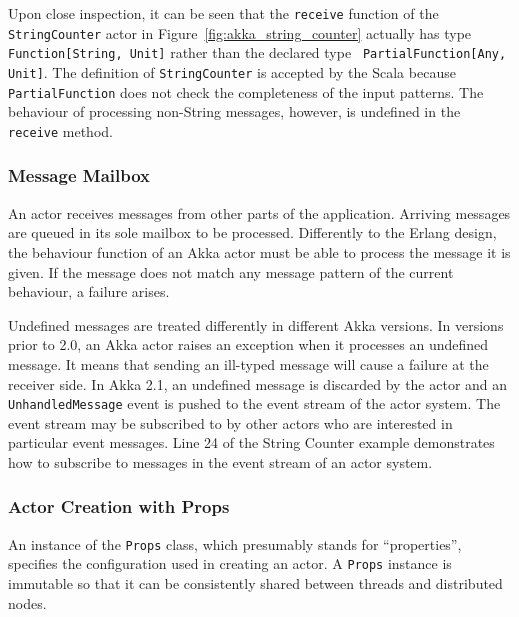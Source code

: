 Upon close inspection, it can be seen that the {\tt receive} function of the 
{\tt StringCounter} actor in Figure~\ref{fig:akka_string_counter} actually 
has type {\tt Function[String, Unit]} rather than the declared type {\tt 
PartialFunction[Any, Unit]}.  The definition  of {\tt StringCounter} is 
accepted by the Scala because {\tt PartialFunction} does not check the 
completeness of the input patterns.  The behaviour of processing non-String 
messages, however, is undefined in the {\tt receive} method.

\subsubsection{Message Mailbox}
\label{message mailbox}

An actor receives messages from other parts of the application.  Arriving 
messages are queued in its sole mailbox to be processed.  Differently to the 
Erlang design, the behaviour function of 
an Akka actor must be able to process the message it is given.  If the message 
does not match any message pattern of the current behaviour, a failure arises.

Undefined messages are treated differently in different Akka versions.  In
versions prior to 2.0, an Akka actor raises an exception when it processes an 
undefined message. It means that sending an ill-typed message will cause a 
failure at the receiver side.  In Akka 2.1, an undefined message is discarded 
by the actor and an {\tt UnhandledMessage} event is pushed to the event stream 
of the actor system. The event stream may be subscribed to by other actors who 
are interested in particular event messages.  Line 24 of the String Counter
example demonstrates how to subscribe to messages in the event stream
of an actor system.




\begin{comment}
In Akka 2.2, the {\tt 
Stash} trait can be used to pending the process of a particular message until 
the current behaviour is updated.
\end{comment}



\subsubsection{Actor Creation with Props}
\label{akka_props}

An instance of the {\tt Props} class, which presumably stands for ``properties'', 
specifies the configuration used in creating an actor. A {\tt Props} instance 
is immutable so that it can be consistently shared between threads and 
distributed nodes.  

